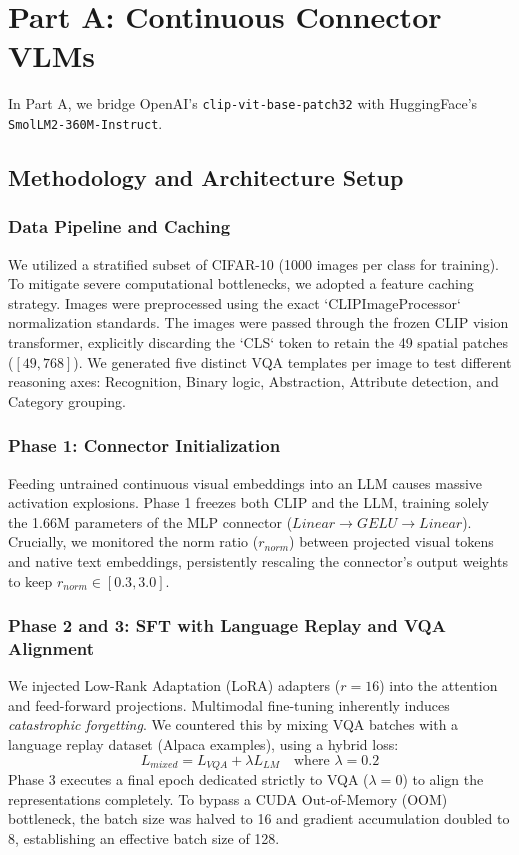 \documentclass[11pt]{article}
\begin{document}
\section{Part A: Continuous Connector VLMs}

In Part A, we bridge OpenAI's \texttt{clip-vit-base-patch32} with HuggingFace's \texttt{SmolLM2-360M-Instruct}. 

\subsection{Methodology and Architecture Setup}

\subsubsection{Data Pipeline and Caching}
We utilized a stratified subset of CIFAR-10 (1000 images per class for training). To mitigate severe computational bottlenecks, we adopted a feature caching strategy. Images were preprocessed using the exact `CLIPImageProcessor` normalization standards. The images were passed through the frozen CLIP vision transformer, explicitly discarding the `CLS` token to retain the 49 spatial patches ($[49, 768]$). We generated five distinct VQA templates per image to test different reasoning axes: Recognition, Binary logic, Abstraction, Attribute detection, and Category grouping.

\subsubsection{Phase 1: Connector Initialization}
Feeding untrained continuous visual embeddings into an LLM causes massive activation explosions. Phase 1 freezes both CLIP and the LLM, training solely the 1.66M parameters of the MLP connector ($Linear \rightarrow GELU \rightarrow Linear$). Crucially, we monitored the norm ratio ($r_{norm}$) between projected visual tokens and native text embeddings, persistently rescaling the connector's output weights to keep $r_{norm} \in [0.3, 3.0]$.

\subsubsection{Phase 2 and 3: SFT with Language Replay and VQA Alignment}
We injected Low-Rank Adaptation (LoRA) adapters ($r=16$) into the attention and feed-forward projections. Multimodal fine-tuning inherently induces \textit{catastrophic forgetting}. We countered this by mixing VQA batches with a language replay dataset (Alpaca examples), using a hybrid loss:
\begin{equation}
    L_{mixed} = L_{VQA} + \lambda L_{LM} \quad \text{where } \lambda = 0.2
\end{equation}
Phase 3 executes a final epoch dedicated strictly to VQA ($\lambda = 0$) to align the representations completely. To bypass a CUDA Out-of-Memory (OOM) bottleneck, the batch size was halved to 16 and gradient accumulation doubled to 8, establishing an effective batch size of 128.
\end{document}
